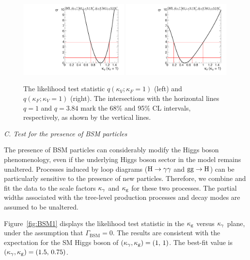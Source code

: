 \documentclass[11pt,twoside,a4paper,cmspaper,final,collab]{cms-tdr}
\begin{document}
\begin{figure}
\centering
\includegraphics[width=0.49\textwidth]{figures/comb/sqr_cvcf_cut_scan_2d_comb_HPA_smallGGScale_slice_CF} \hfill
\includegraphics[width=0.49\textwidth]{figures/comb/sqr_cvcf_cut_scan_2d_comb_HPA_smallGGScale_slice_CV}
\caption{
The likelihood test statistic $q(\kappa_V;\kappa_F=1)$ (left) and $q(\kappa_F;\kappa_V=1)$ (right).
The intersections with the horizontal lines $q=1$ and $q=3.84$ mark the 68\% and 95\% CL intervals, respectively,
as shown by the vertical lines.
}
\label{fig:cVcF_1D}
\end{figure}


\textit{C. Test for the presence of BSM particles}


The presence of BSM  particles can considerably modify the Higgs boson phenomenology,
even if the underlying Higgs boson sector in the model remains unaltered.
Processes induced by loop diagrams ($\mathrm{H} \to \gamma\gamma$ and $\mathrm{g}\mathrm{g} \to \mathrm{H}$)
can be particularly sensitive to the presence of new particles.
Therefore, we combine and fit the data to the scale factors $\kappa_{\gamma}$ and $\kappa_{\mathrm{g}}$
for these two processes. The partial widths associated with the tree-level production processes
and decay modes are assumed to be unaltered.

Figure~\ref{fig:BSM1} displays  the likelihood test statistic in the $\kappa_{\mathrm{g}}$ versus $\kappa_{\gamma}$ plane, under
the assumption that $\Gamma_{\mathrm{BSM}}=0$.
The results are consistent with the expectation for the SM Higgs boson
of $(\kappa_{\gamma}, \kappa_{\mathrm{g}})=(1, \,1)$.
The best-fit value is $(\kappa_{\gamma}, \kappa_{\mathrm{g}})=(1.5,\,0.75)$.
\end{document}
